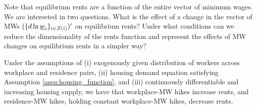 
Note that equilibrium rents are a function of the entire vector of minimum wages. 
We are interested in two questions.
What is the effect of a change in the vector of MWs $(\{d \ln \underline{w}_i\}_{i\in\mathcal{Z}(i)})'$
on equilibrium rents?
Under what conditions can we reduce the dimensionality of the rents function and 
represent the effects of MW changes on equilibrium rents in a simpler way?

\begin{prop}\label{prop:comparative_statics}
    Under the assumptions of
    (i) exogenously given distribution of workers across workplace and residence
    pairs,
    (ii) housing demand equation satisfying Assumption \ref{assu:housing_function}, 
    and 
    (iii) continuously differentiable and increasing housing supply, we have that
    workplace-MW hikes increase rents, and residence-MW hikes, holding constant 
    workplace-MW hikes, decrease rents.
\end{prop}


